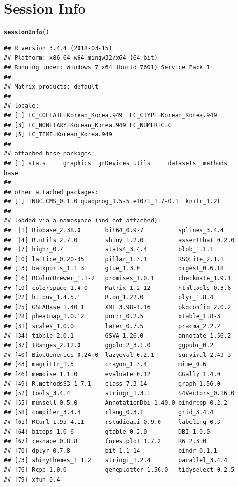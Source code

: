 \documentclass{article}\usepackage[]{graphicx}\usepackage[]{color}
\makeatletter
\newcommand{\hlstd}[1]{\textcolor[rgb]{0.345,0.345,0.345}{#1}}%
\newcommand{\hlkwd}[1]{\textcolor[rgb]{0.737,0.353,0.396}{\textbf{#1}}}%
\newenvironment{kframe}{%
 \def\at@end@of@kframe{}%
 \ifinner\ifhmode%
  \def\at@end@of@kframe{\end{minipage}}%
  \begin{minipage}{\columnwidth}%
 \fi\fi%
 \def\FrameCommand##1{\hskip\@totalleftmargin \hskip-\fboxsep
 \colorbox{shadecolor}{##1}\hskip-\fboxsep
     \hskip-\linewidth \hskip-\@totalleftmargin \hskip\columnwidth}%
 \MakeFramed {\advance\hsize-\width
   \@totalleftmargin\z@ \linewidth\hsize
   \@setminipage}}%
 {\par\unskip\endMakeFramed%
 \at@end@of@kframe}
\newenvironment{knitrout}{}{} %
\makeatother
\begin{document}
\section{Session Info}
\begin{knitrout}
\color{fgcolor}\begin{kframe}
\begin{alltt}
\hlkwd{sessionInfo}\hlstd{()}
\end{alltt}
\begin{verbatim}
## R version 3.4.4 (2018-03-15)
## Platform: x86_64-w64-mingw32/x64 (64-bit)
## Running under: Windows 7 x64 (build 7601) Service Pack 1
## 
## Matrix products: default
## 
## locale:
## [1] LC_COLLATE=Korean_Korea.949  LC_CTYPE=Korean_Korea.949   
## [3] LC_MONETARY=Korean_Korea.949 LC_NUMERIC=C                
## [5] LC_TIME=Korean_Korea.949    
## 
## attached base packages:
## [1] stats     graphics  grDevices utils     datasets  methods   base     
## 
## other attached packages:
## [1] TNBC.CMS_0.1.0 quadprog_1.5-5 e1071_1.7-0.1  knitr_1.21    
## 
## loaded via a namespace (and not attached):
##  [1] Biobase_2.38.0       bit64_0.9-7          splines_3.4.4       
##  [4] R.utils_2.7.0        shiny_1.2.0          assertthat_0.2.0    
##  [7] highr_0.7            stats4_3.4.4         blob_1.1.1          
## [10] lattice_0.20-35      pillar_1.3.1         RSQLite_2.1.1       
## [13] backports_1.1.3      glue_1.3.0           digest_0.6.18       
## [16] RColorBrewer_1.1-2   promises_1.0.1       checkmate_1.9.1     
## [19] colorspace_1.4-0     Matrix_1.2-12        htmltools_0.3.6     
## [22] httpuv_1.4.5.1       R.oo_1.22.0          plyr_1.8.4          
## [25] GSEABase_1.40.1      XML_3.98-1.16        pkgconfig_2.0.2     
## [28] pheatmap_1.0.12      purrr_0.2.5          xtable_1.8-3        
## [31] scales_1.0.0         later_0.7.5          pracma_2.2.2        
## [34] tibble_2.0.1         GSVA_1.26.0          annotate_1.56.2     
## [37] IRanges_2.12.0       ggplot2_3.1.0        ggpubr_0.2          
## [40] BiocGenerics_0.24.0  lazyeval_0.2.1       survival_2.43-3     
## [43] magrittr_1.5         crayon_1.3.4         mime_0.6            
## [46] memoise_1.1.0        evaluate_0.12        GGally_1.4.0        
## [49] R.methodsS3_1.7.1    class_7.3-14         graph_1.56.0        
## [52] tools_3.4.4          stringr_1.3.1        S4Vectors_0.16.0    
## [55] munsell_0.5.0        AnnotationDbi_1.40.0 bindrcpp_0.2.2      
## [58] compiler_3.4.4       rlang_0.3.1          grid_3.4.4          
## [61] RCurl_1.95-4.11      rstudioapi_0.9.0     labeling_0.3        
## [64] bitops_1.0-6         gtable_0.2.0         DBI_1.0.0           
## [67] reshape_0.8.8        forestplot_1.7.2     R6_2.3.0            
## [70] dplyr_0.7.8          bit_1.1-14           bindr_0.1.1         
## [73] shinythemes_1.1.2    stringi_1.2.4        parallel_3.4.4      
## [76] Rcpp_1.0.0           geneplotter_1.56.0   tidyselect_0.2.5    
## [79] xfun_0.4
\end{verbatim}
\end{kframe}
\end{knitrout}
\end{document}
